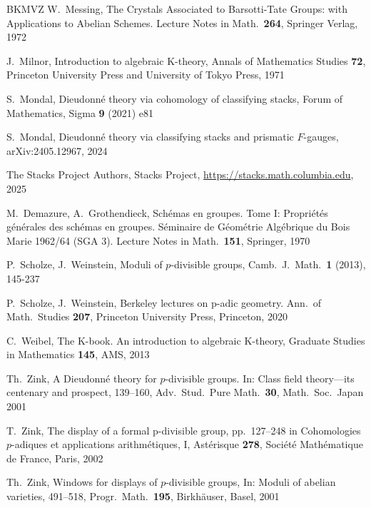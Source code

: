 \documentclass[a4paper,11pt]{amsart}
\theoremstyle{plain}
\theoremstyle{definition}
\theoremstyle{remark}
\numberwithin{equation}{section}
\begin{document}
\begin{thebibliography}{BKMVZ}
W.~Messing,
The Crystals Associated to Barsotti-Tate Groups: 
with Applications to Abelian Schemes. 
Lecture Notes in Math.\ {\bf 264}, Springer Verlag, 1972

J.~Milnor,
Introduction to algebraic K-theory,
Annals of Mathematics Studies {\bf 72}, 
Princeton University Press and University of Tokyo Press, 1971

S.~Mondal,
Dieudonn\'e theory via cohomology of classifying stacks,
Forum of Mathematics, Sigma {\bf 9} (2021) e81

S.~Mondal,
Dieudonn\'e theory via classifying stacks and prismatic $F$-gauges,
arXiv:2405.12967, 2024

The {Stacks Project Authors}, Stacks Project, \url{https://stacks.math.columbia.edu}, 2025

M.~Demazure, A.~Grothendieck, 
Sch\'emas en groupes. Tome I: Propri\'et\'es g\'en\'erales des sch\'emas en groupes. S\'eminaire de G\'eom\'etrie Alg\'ebrique du Bois Marie 1962/64 (SGA 3). Lecture Notes in Math.\ {\bf 151}, Springer, 1970

P.~Scholze, J.~Weinstein,
Moduli of $p$-divisible groups,
Camb.\ J.\ Math.\ {\bf 1} (2013), 145-237

P.~Scholze, J.~Weinstein,
Berkeley lectures on p-adic geometry. 
Ann.\ of Math.\ Studies {\bf 207}, 
Princeton University Press, Princeton, 2020

C.~Weibel, The K-book. An introduction to algebraic K-theory,
Graduate Studies in Mathematics {\bf 145}, AMS, 2013

Th.~Zink,
A Dieudonn\'{e} theory for $p$-divisible groups.
In: Class field theory---its centenary and prospect, 
139--160, Adv.\ Stud.\ Pure Math.\ {\bf 30}, 
Math.\ Soc.\ Japan 2001

T.~Zink, The display of a formal p-divisible group, pp.\ 127--248 in Cohomologies \(p\)-adiques et applications arithm\'etiques, I, Ast\'erisque {\bf 278}, Soci\'et\'e Math\'ematique de France, Paris, 2002

Th.~Zink,
Windows for displays of $p$-divisible groups,
In: Moduli of abelian varieties, 491--518, 
Progr.\ Math.\ {\bf 195}, Birkh\"{a}user, Basel, 2001


\end{thebibliography}
\end{document}
